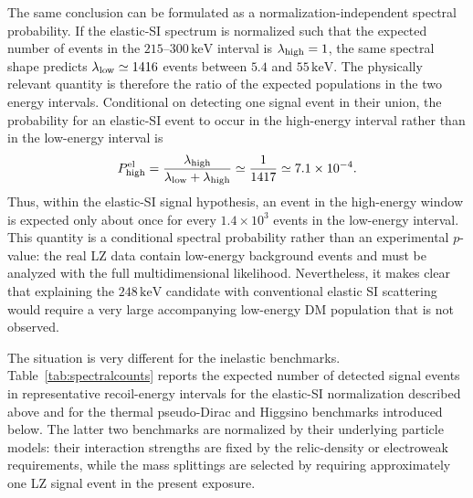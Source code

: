 \documentclass[aps,prd,reprint,superscriptaddress,nofootinbib,longbibliography,floatfix]{revtex4-2}
\newcommand{\keV}{\mathrm{keV}}
\begin{document}
The same conclusion can be formulated as a normalization-independent spectral probability. If the elastic-SI spectrum is normalized such that the expected number of events in the $215$--$300\,\keV$ interval is $\lambda_{\rm high}=1$, the same spectral shape predicts $\lambda_{\rm low}\simeq1416$ events between $5.4$ and $55\,\keV$. The physically relevant quantity is therefore the ratio of the expected populations in the two energy intervals. Conditional on detecting one signal event in their union, the probability for an elastic-SI event to occur in the high-energy interval rather than in the low-energy interval is
\begin{equation}
P_{\rm high}^{\rm el}
=
\frac{\lambda_{\rm high}}
{\lambda_{\rm low}+\lambda_{\rm high}}
\simeq
\frac{1}{1417}
\simeq7.1\times10^{-4}.
\end{equation}
Thus, within the elastic-SI signal hypothesis, an event in the high-energy window is expected only about once for every $1.4\times10^3$ events in the low-energy interval. This quantity is a conditional spectral probability rather than an experimental $p$-value: the real LZ data contain low-energy background events and must be analyzed with the full multidimensional likelihood. Nevertheless, it makes clear that explaining the $248\,\keV$ candidate with conventional elastic SI scattering would require a very large accompanying low-energy DM population that is not observed.

The situation is very different for the inelastic benchmarks. Table~\ref{tab:spectralcounts} reports the expected number of detected signal events in representative recoil-energy intervals for the elastic-SI normalization described above and for the thermal pseudo-Dirac and Higgsino benchmarks introduced below. The latter two benchmarks are normalized by their underlying particle models: their interaction strengths are fixed by the relic-density or electroweak requirements, while the mass splittings are selected by requiring approximately one LZ signal event in the present exposure.
\end{document}

